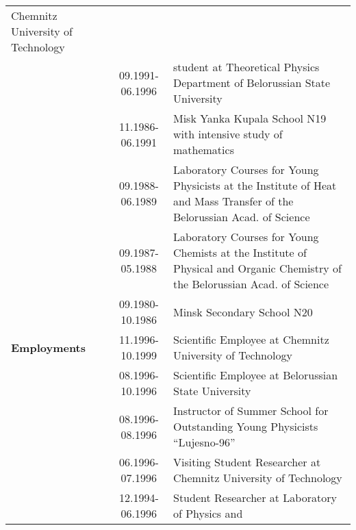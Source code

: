 \documentclass[12pt,twoside,a4paper]{report}
\begin{document}
{\begin{tabular}{|l||cp{10cm}|}
                                                                                            Chemnitz University of Technology \\
                                                  & 09.1991-06.1996  & student at Theoretical Physics Department 
                                                                             of Belorussian State University 
                                                                                                       \\
                                                  & 11.1986-06.1991 & Misk Yanka Kupala School N19 with intensive study of mathematics  \\
                                                  & 09.1988-06.1989 & Laboratory Courses for Young Physicists at the
                                                                            Institute of Heat and Mass Transfer
                                                                            of the Belorussian Acad. of Science                               \\ 
                                                  & 09.1987-05.1988 & Laboratory Courses for Young Chemists at the 
                                                                            Institute of Physical and Organic  Chemistry 
                                                                            of the Belorussian Acad. of Science                                \\
                                                  & 09.1980-10.1986 & Minsk Secondary School N20   \\ \hline
                      {\bf Employments}           & 11.1996-10.1999 & Scientific Employee at Chemnitz University of Technology      \\
                                                  & 08.1996-10.1996 & Scientific Employee at Belorussian State University           \\
                                                  & 08.1996-08.1996 & Instructor of Summer School for Outstanding 
                                                                            Young Physicists ``Lujesno-96''                              \\
                                                  & 06.1996-07.1996 & Visiting Student Researcher at Chemnitz University of Technology      \\
                                                  & 12.1994-06.1996 & Student Researcher at Laboratory of Physics and 

\end{tabular}}
\end{document}
